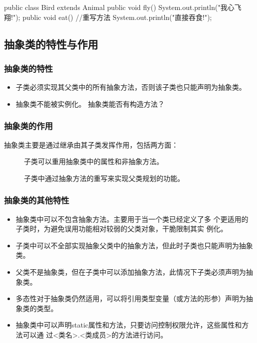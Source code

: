 \begin{javaCode}
  public class Bird extends Animal {
    public void fly(){
      System.out.println("我心飞翔!");
    }
    public void eat(){  //重写方法
      System.out.println("直接吞食!");
    }
  }
\end{javaCode}


\subsection{抽象类的特性与作用}

\subsubsection{抽象类的特性}

\begin{itemize}
\item 子类必须实现其父类中的所有抽象方法，否则该子类也只能声明为抽象类。
\item 抽象类不能被实例化。 抽象类能否有构造方法？
\end{itemize}
  
\subsubsection{抽象类的作用}
  
抽象类主要是通过继承由其子类发挥作用，包括两方面：
  
\begin{description}
\item[] 子类可以重用抽象类中的属性和非抽象方法。
\item[] 子类中通过抽象方法的重写来实现父类规划的功能。
\end{description}


\subsubsection{抽象类的其他特性}
  
\begin{itemize}
\item 抽象类中可以不包含抽象方法。{\kai 主要用于当一个类已经定义了多
    个更适用的子类时，为避免误用功能相对较弱的父类对象，干脆限制其实
    例化。}
\item 子类中可以不全部实现抽象父类中的抽象方法，但此时子类也只能声明为抽象类。
\item 父类不是抽象类，但在子类中可以添加抽象方法，此情况下子类必须声明为抽象类。
\item 多态性对于抽象类仍然适用，可以将引用类型变量（或方法的形参）声明为抽象类的类型。
\item 抽象类中可以声明static属性和方法，只要访问控制权限允许，这些属性和方法可以通
  过{\kai <类名>.<类成员>}的方法进行访问。
\end{itemize}

